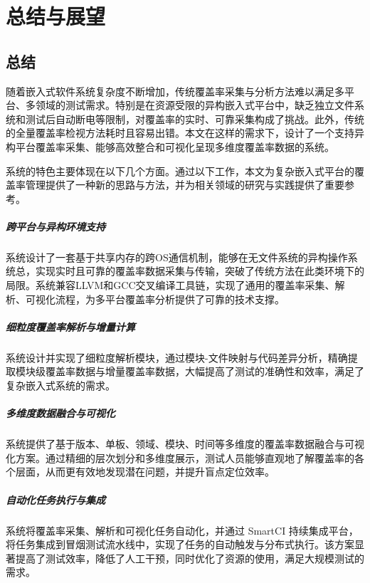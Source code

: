 
\chapter{总结与展望}
\section{总结}
随着嵌入式软件系统复杂度不断增加，传统覆盖率采集与分析方法难以满足多平台、多领域的测试需求。特别是在资源受限的异构嵌入式平台中，缺乏独立文件系统和测试后自动断电等限制，对覆盖率的实时、可靠采集构成了挑战。此外，传统的全量覆盖率检视方法耗时且容易出错。本文在这样的需求下，设计了一个支持异构平台覆盖率采集、能够高效整合和可视化呈现多维度覆盖率数据的系统。

系统的特色主要体现在以下几个方面。通过以下工作，本文为复杂嵌入式平台的覆盖率管理提供了一种新的思路与方法，并为相关领域的研究与实践提供了重要参考。

\paragraph{\textbf{跨平台与异构环境支持}}
系统设计了一套基于共享内存的跨OS通信机制，能够在无文件系统的异构操作系统总，实现实时且可靠的覆盖率数据采集与传输，突破了传统方法在此类环境下的局限。系统兼容LLVM和GCC交叉编译工具链，实现了通用的覆盖率采集、解析、可视化流程，为多平台覆盖率分析提供了可靠的技术支撑。

\paragraph{\textbf{细粒度覆盖率解析与增量计算}}
系统设计并实现了细粒度解析模块，通过模块-文件映射与代码差异分析，精确提取模块级覆盖率数据与增量覆盖率数据，大幅提高了测试的准确性和效率，满足了复杂嵌入式系统的需求。

\paragraph{\textbf{多维度数据融合与可视化}}
系统提供了基于版本、单板、领域、模块、时间等多维度的覆盖率数据融合与可视化方案。通过精细的层次划分和多维度展示，测试人员能够直观地了解覆盖率的各个层面，从而更有效地发现潜在问题，并提升盲点定位效率。

\paragraph{\textbf{自动化任务执行与集成}}
系统将覆盖率采集、解析和可视化任务自动化，并通过 SmartCI 持续集成平台，将任务集成到冒烟测试流水线中，实现了任务的自动触发与分布式执行。该方案显著提高了测试效率，降低了人工干预，同时优化了资源的使用，满足大规模测试的需求。

